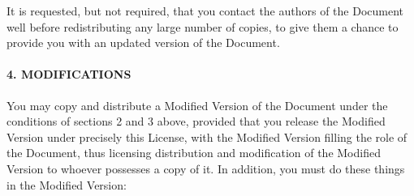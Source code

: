 \begin{multicols}{2}
{\footnotesize It is requested, but not required, that you contact the authors of the Document well before redistributing any large number of copies, to give them a chance to provide you with an updated version of the Document.}{\footnotesize \par}


\paragraph{{\footnotesize 4. MODIFICATIONS}}

{\footnotesize You may copy and distribute a Modified Version of the Document under the conditions of sections 2 and 3 above, provided that you release the Modified Version under precisely this License, with the Modified Version filling the role of the Document, thus licensing distribution and modification of the Modified Version to whoever possesses a copy of it. In addition, you must do these things in the Modified Version:}{\footnotesize \par}


\end{multicols}
